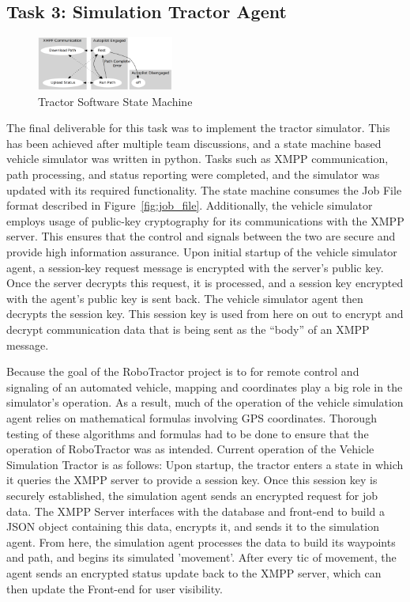 \documentclass[conference,12pt]{IEEEtran}
\begin{document}
\subsection{Task 3: Simulation Tractor Agent}

\begin{figure}
\centering
\includegraphics[width=0.4\textwidth]{Images/machine.png}
\caption{Tractor Software State Machine}
\label{fig:tractorstatemachine}
\end{figure}
The final deliverable for this task was to implement the tractor simulator. This
has been achieved after multiple team discussions, and a state machine based
vehicle simulator was written in python. Tasks such as XMPP communication, path
processing, and status reporting were completed, and the simulator was updated
with its required functionality. The state machine consumes the Job File format
described in Figure~\ref{fig:job_file}. Additionally, the vehicle simulator
employs usage of public-key cryptography for its communications with the XMPP
server. This ensures that the control and signals between the two are secure and
provide high information assurance. Upon initial startup of the vehicle
simulator agent, a session-key request message is encrypted with the server's
public key. Once the server decrypts this request, it is processed, and
a session key encrypted with the agent's public key is sent back. The vehicle
simulator agent then decrypts the session key. This session key is used from
here on out to encrypt and decrypt communication data that is being sent as the
``body'' of an XMPP message. 

Because the goal of the RoboTractor project is to for remote control and
signaling of an automated vehicle, mapping and coordinates play a big role in
the simulator's operation. As a result, much of the operation of the vehicle
simulation agent relies on mathematical formulas involving GPS coordinates.
Thorough testing of these algorithms and formulas had to be done to ensure that
the operation of RoboTractor was as intended. Current operation of the Vehicle
Simulation Tractor is as follows: Upon startup, the tractor enters a state in
which it queries the XMPP server to provide a session key. Once this session key
is securely established, the simulation agent sends an encrypted request for job
data. The XMPP Server interfaces with the database and front-end to build a JSON
object containing this data, encrypts it, and sends it to the simulation agent.
From here, the simulation agent processes the data to build its waypoints and
path, and begins its simulated 'movement'. After every tic of movement, the
agent sends an encrypted status update back to the XMPP server, which can then
update the Front-end for user visibility. 
\end{document}
